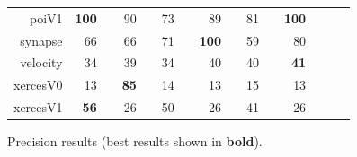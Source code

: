 \documentclass{sig-alternative}
\newcommand{\rone}{}
\newcommand{\rtwo}{}
\newcommand{\rthree}{}
\newcommand{\rfour}{}
\begin{document}
\begin{figure}[!h]
\begin{tabular}{r|rl|rl|rl|rl|rl|rlrl}
poiV1 & {\bf  100} & {\rfour} & 90 & {\rthree} & 73 &         & 89 & {\rtwo} & 81 & {\rone} & {\bf 100} & {\rfour}\\
synapse & 66 &         & 66 &         & 71 & {\rone} & {\bf 100} & {\rfour} & 59 &         & 80 & {\rtwo}\\
velocity & 34 &         & 39 & {\rthree} & 34 &         & 40 & {\rfour} & 40 & {\rfour} & {\bf 41} & {\rfour}\\
xercesV0 & 13 &         & {\bf 85} & {\rfour} & 14 &         & 13 &         & 15 &         & 13 &        \\
xercesV1 & {\bf 56} & {\rfour} & 26 &         & 50 & {\rthree} & 26 &         & 41 & {\rtwo} & 26 &        \\
\end{tabular}
\caption{Precision results (best results  shown in {\bf bold}).}
\label{fig:precisionbars}
\end{figure}
\end{document}
